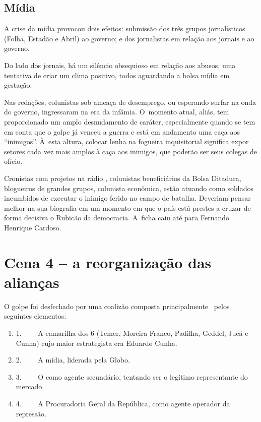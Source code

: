 \subsection{Mídia}

A crise da mídia provocou dois efeitos: submissão dos três grupos
jornalísticos (Folha, Estadão e Abril) ao governo; e dos jornalistas em
relação aos jornais e ao governo.

Do lado dos jornais, há um silêncio obsequioso em relação aos abusos,
uma tentativa de criar um clima positivo, todos aguardando a bolsa mídia
em gestação.

Nas redações, colunistas sob ameaça de desemprego, ou esperando surfar
na onda do governo, ingressaram na era da infâmia. O~momento atual,
aliás, tem proporcionado um amplo desnudamento de caráter, especialmente
quando se tem em conta que o golpe já venceu a guerra e está em
andamento uma caça aos ``inimigos''. À~esta altura, colocar lenha na
fogueira inquisitorial significa expor setores cada vez mais amplos à
caça aos inimigos, que poderão ser seus colegas de ofício.

Cronistas com projetos na rádio , colunistas beneficiários da Bolsa
Ditadura, blogueiros de grandes grupos, colunista econômica, estão
atuando como soldados incumbidos de executar o inimigo ferido no campo
de batalha. Deveriam pensar melhor na sua biografia em um momento em que
o país está prestes a cruzar de forma decisiva o Rubicão da democracia.
A~ficha caiu até para Fernando Henrique Cardoso.

\section{Cena 4 -- a reorganização das alianças}

O golpe foi desfechado por uma coalizão composta principalmente ~pelos
seguintes elementos:

\begin{enumerate}
\itemsep1pt\parskip0pt
\item
  1.~~~~ A camarilha dos 6 (Temer, Moreira Franco, Padilha, Geddel, Jucá
  e Cunha) cujo maior estrategista era Eduardo Cunha.
\item
  2.~~~~ A mídia, liderada pela Globo.
\item
  3.~~~~ O  como agente secundário, tentando ser o legítimo
  representante do mercado.
\item
  4.~~~~ A Procuradoria Geral da República, como agente operador da
  repressão.
\end{enumerate}

